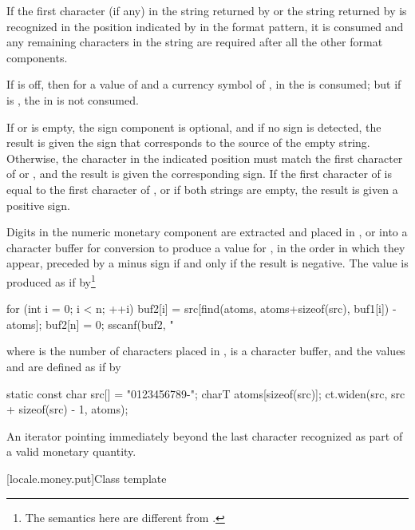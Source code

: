 \begin{itemdescr}
\pnum
If the first character (if any) in the string
returned by
or the string
returned by
is recognized in the position indicated by
in the format pattern, it is consumed and any remaining characters
in the string are required after all the other format components.
\begin{example}
If
is off, then for a
value of  and a currency symbol of ,
in  the  is consumed;
but if
is , the  in  is not consumed.
\end{example}
If
or
is empty, the sign component is optional, and if no sign is
detected, the result is given the sign that corresponds to the source
of the empty string.
Otherwise, the character in the indicated position must
match the first character of
or
,
and the result is given the corresponding sign.
If the first character of
is equal to the first character of
,
or if both strings are empty, the result is given a positive sign.

\pnum
Digits in the numeric monetary component are extracted and placed in
,
or into a character buffer
for conversion to produce a value for
,
in the order in which they appear,
preceded by a minus sign if and only if the result is negative.
The value
is produced as if by\footnote{The semantics here are different from
.}
\begin{codeblock}
for (int i = 0; i < n; ++i)
  buf2[i] = src[find(atoms, atoms+sizeof(src), buf1[i]) - atoms];
buf2[n] = 0;
sscanf(buf2, "%
\end{codeblock}
where
is the number of characters placed in
,
is a character buffer, and the values
and
are defined as if by
\begin{codeblock}
static const char src[] = "0123456789-";
charT atoms[sizeof(src)];
ct.widen(src, src + sizeof(src) - 1, atoms);
\end{codeblock}

\pnum
\returns
An iterator pointing immediately beyond the last character recognized
as part of a valid monetary quantity.
\end{itemdescr}

[locale.money.put]{Class template }

